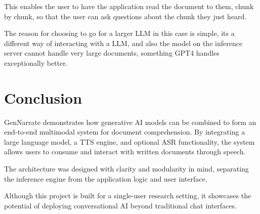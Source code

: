\documentclass[twocolumn]{article}
\begin{document}
This enables the user to have the application read the document to them, chunk by chunk, so that the user can ask questions about the chunk they just heard. 

The reason for choosing to go for a larger LLM in this case is simple, its a different way of interacting with a LLM, and also the model on the inference server cannot handle very large documents, something GPT4 handles exceptionally better.

\section{Conclusion}
GenNarrate demonstrates how generative AI models can be combined to form an end-to-end multimodal system for document comprehension. By integrating a large language model, a TTS engine, and optional ASR functionality, the system allows users to consume and interact with written documents through speech.

The architecture was designed with clarity and modularity in mind, separating the inference engine from the application logic and user interface.

Although this project is built for a single-user research setting, it showcases the potential of deploying conversational AI beyond traditional chat interfaces.

\subsubsection{}


\end{document}
